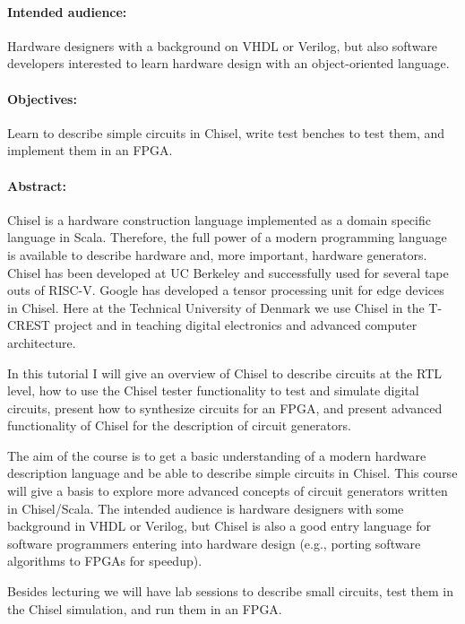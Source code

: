 \documentclass{article}
\begin{document}
\paragraph{Intended audience:}

Hardware designers with a background on VHDL or Verilog, but also software developers
interested to learn hardware design with an object-oriented language.
 
\paragraph{Objectives:}

Learn to describe simple circuits in Chisel, write test benches to test them, and implement them
in an FPGA.

\paragraph{Abstract:}

Chisel is a hardware construction language implemented as a domain specific language in Scala. Therefore, the full power of a modern programming language is available to describe hardware and, more important, hardware generators. Chisel has been developed at UC Berkeley and successfully used for several tape outs of RISC-V. Google has developed a tensor processing unit for edge devices in Chisel. Here at the Technical University of Denmark we use Chisel in the T-CREST project and in teaching digital electronics and advanced computer architecture.

In this tutorial I will give an overview of Chisel to describe circuits at the RTL level, how to use the Chisel tester functionality to test and simulate digital circuits, present how to synthesize circuits for an FPGA, and present advanced functionality of Chisel for the description of circuit generators.

The aim of the course is to get a basic understanding of a modern hardware description language and be able to describe simple circuits in Chisel. This course will give a basis to explore more advanced concepts of circuit generators written in Chisel/Scala. The intended audience is hardware designers with some background in VHDL or Verilog, but Chisel is also a good entry language for software programmers entering into hardware design
(e.g., porting software algorithms to FPGAs for speedup).

Besides lecturing we will have lab sessions to describe small circuits, test them in the Chisel simulation,
and run them in an FPGA.
\end{document}
